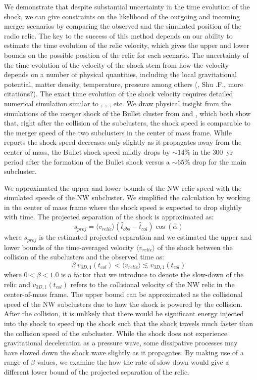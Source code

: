 We demonstrate that despite substantial uncertainty in the time
evolution of the shock, we can give constraints on the likelihood of the
outgoing and incoming merger scenarios by comparing the observed and the
simulated position of the radio relic.
The key to the success of this method depends on our ability to estimate the
time evolution of the relic velocity, which gives the upper and lower
bounds on the possible position of the relic for each scenario. The
uncertainty of the time evolution of the velocity of the shock stem from
how the velocity depends on a number of physical quantities, including the
local gravitational potential, matter density, temperature, pressure among
others (\citealt{E98}, Shu .F., more citations?).  The exact time evolution
of the shock velocity requires detailed numerical simulation similar to
\citet{Springel2007}, \citet{Vazza11}, \citet{Kang2007}, etc. 
We draw physical insight from the simulations of the merger shock of the
Bullet cluster from \citet{Springel2007} and \citet{Paul2011b}, which both show
that, right after the collision of the subclusters, the shock speed is
comparable to the merger speed of the two subclusters in the center of mass
frame.  While \citet{Paul2011b} reports the shock speed decreases only
slightly as it propagates away from the center of mass, the Bullet shock
speed mildly drops by $\sim 14\%$ in the 300~\mega yr period after the
formation of the Bullet shock versus a $\sim65\%$ drop for the main
subcluster. \par  
We approximated the upper and lower bounds of the NW relic speed with the
simulated speeds of the NW subcluster.  We simplified the calculation by
working in the center of mass frame where the shock speed is expected to
drop slightly with time. 
The projected separation of the shock is approximated as:
\begin{equation}
	s_{proj} = \langle v_{relic} \rangle (\hat{t}_{obs} - \hat{t}_{col}) \cos(\hat{\alpha})
\end{equation}
where $s_{proj}$ is the estimated projected separation and we estimated the
upper and lower bounds of the time-averaged velocity
$\langle v_{relic} \rangle$ of the shock between
the collision of the subclusters and the observed time as:  
\begin{equation}
	\beta~v_{3D,1}(t_{col}) < \langle v_{relic} \rangle \lesssim v_{3D,1}(t_{col}) 
\end{equation}
where $0 < \beta < 1.0$ is a factor that we introduce to denote the slow-down
of the relic and $v_{3D,1}(t_{col})$ refers to the collisional velocity of
the NW relic in the center-of-mass frame. The upper bound can be
approximated as the collisional speed of the NW subclusters due to how the
shock is powered by the collision. After the collision, it is unlikely that
there would be significant energy injected into the shock to speed up the shock such that
the shock travels much faster than the collision speed of the subcluster. 
While the shock does not experience gravitational deceleration as a
pressure wave, some dissipative processes may have slowed down the shock
wave slightly as it propagates. By making use of a
range of $\beta$ values, we examine the how the rate of slow down would
give a different lower bound of the projected separation of the relic.   


